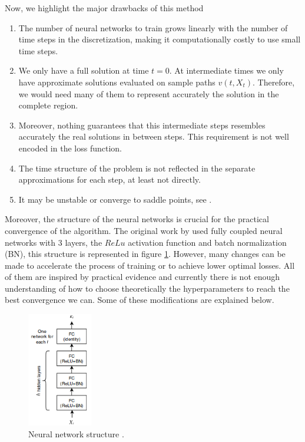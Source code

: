 Now, we highlight the major drawbacks of this method 
\begin{enumerate}
	\item The number of neural networks to train grows linearly with the number of time steps in the discretization, making it computationally costly to use small time steps.
	\item We only have a full solution at time $t=0$. At intermediate times we only have approximate solutions evaluated on sample paths $v(t,X_t)$. Therefore, we would need many of them to represent accurately the solution in the complete region.
	\item Moreover, nothing guarantees that this intermediate steps resembles accurately the real solutions in between steps. This requirement is not well encoded in the loss function.
	\item The time structure of the problem is not reflected in the separate approximations for each step, at least not directly.
	\item It may be unstable or converge to saddle points, see \cite{hure_deep_2020}.
\end{enumerate}     

Moreover, the structure of the neural networks is crucial for the practical convergence of the algorithm. The original work by \cite{han_solving_2018} used fully coupled neural networks with 3 layers, the $ReLu$ activation function and batch normalization (BN), this structure is represented in figure \ref{fig:FCStructure}. However, many changes can be made to accelerate the process of training or to achieve lower optimal losses. All of them are inspired by practical evidence and currently there is not enough understanding of how to choose theoretically the hyperparameters to reach the best convergence we can. Some of these modifications are explained below.

\begin{figure}[H]
	\centering
	\includegraphics[width=0.4\linewidth,height=5cm]{images/FCStructure}
	\caption{Neural network structure \cite{chan-wai-nam_machine_2018}.}
	\label{fig:FCStructure}
\end{figure}

